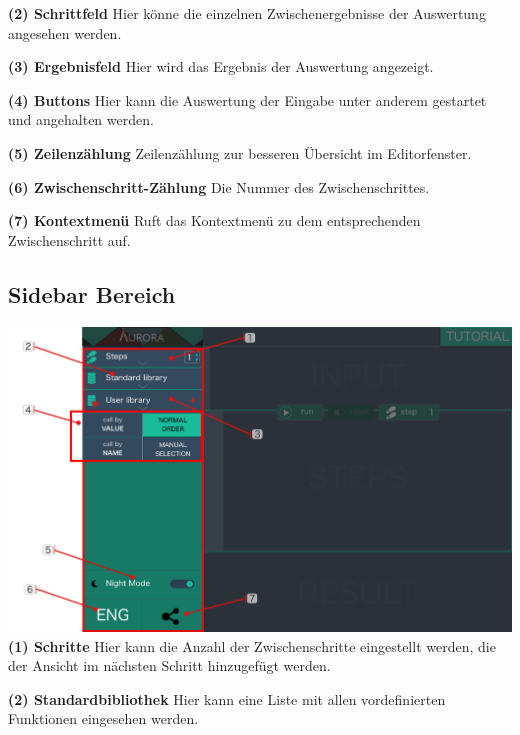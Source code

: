 \documentclass[parskip=full,11pt,twoside]{scrartcl}
\begin{document}
\textbf{(2) Schrittfeld}
\newline Hier könne die einzelnen Zwischenergebnisse der Auswertung angesehen werden.

\textbf{(3) Ergebnisfeld}
\newline Hier wird das Ergebnis der Auswertung angezeigt.

\textbf{(4) Buttons}
\newline Hier kann die Auswertung der Eingabe unter anderem gestartet und angehalten werden.

\textbf{(5) Zeilenzählung}
\newline Zeilenzählung zur besseren Übersicht im Editorfenster.

\textbf{(6) Zwischenschritt-Zählung}
\newline Die Nummer des Zwischenschrittes.

\textbf{(7) Kontextmenü}
\newline Ruft das Kontextmenü zu dem entsprechenden Zwischenschritt auf.


\subsection{Sidebar Bereich}
\includegraphics[width=\textwidth]{../GUI-Design/tutorials/Tutorial_Sidebar_Section.png}
\newline
\newline
\textbf{(1) Schritte}
\newline Hier kann die Anzahl der Zwischenschritte eingestellt werden, die der Ansicht im nächsten Schritt hinzugefügt werden.

\textbf{(2) Standardbibliothek}
\newline Hier kann eine Liste mit allen vordefinierten Funktionen eingesehen werden.
\end{document}
